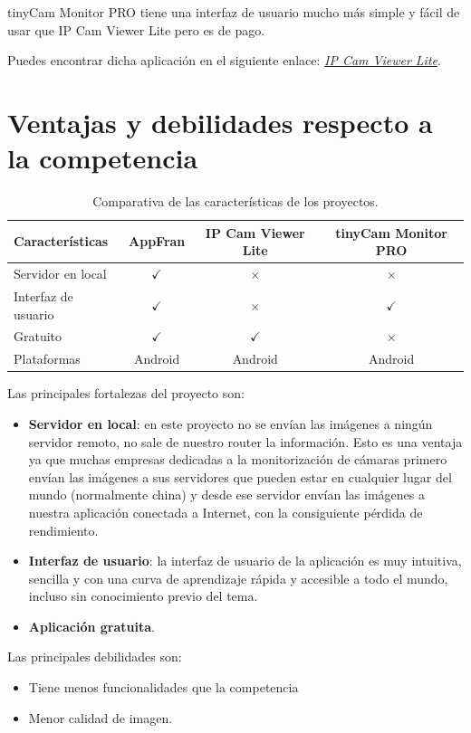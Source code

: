 tinyCam Monitor PRO tiene una interfaz de usuario mucho más simple y fácil de usar que IP Cam Viewer Lite pero es de pago.

Puedes encontrar dicha aplicación en el siguiente enlace: \href{https://play.google.com/store/apps/details?id=com.alexvas.dvr.pro&hl=es&gl=US}{\textit{IP Cam Viewer Lite}}.



\section{Ventajas y debilidades respecto a la competencia}


\begin{table}[h!]
\centering
\begin{tabular}{lccc}
\toprule
Características                 & AppFran     & IP Cam Viewer Lite & tinyCam Monitor PRO   \\
\midrule
Servidor en local               & \cellcolor{green!25} {$\checkmark$} & \cellcolor{red!25} {$\times$}  & \cellcolor{red!25} {$\times$}  \\
Interfaz de usuario             & \cellcolor{green!25} {$\checkmark$} & \cellcolor{red!25} {$\times$}  & \cellcolor{green!25} {$\checkmark$}  \\
Gratuito                        & \cellcolor{green!25} {$\checkmark$} & \cellcolor{green!25} {$\checkmark$}  & \cellcolor{red!25} {$\times$}  \\
Plataformas                     & Android    & Android     & Android     \\
\bottomrule
\end{tabular}
\caption{Comparativa de las características de los proyectos.}
\label{comparativa-proyectos}
\end{table}

Las principales fortalezas del proyecto son:

\begin{itemize}
\tightlist
\item
  \textbf{Servidor en local}: en este proyecto no se envían las imágenes a ningún servidor remoto, no sale de nuestro router la información. Esto es una ventaja ya que muchas empresas dedicadas a la monitorización de cámaras primero envían las imágenes a sus servidores que pueden estar en cualquier lugar del mundo (normalmente china) y desde ese servidor envían las imágenes a nuestra aplicación conectada a Internet, con la consiguiente pérdida de rendimiento.
\item
  \textbf{Interfaz de usuario}: la interfaz de usuario de la aplicación es muy intuitiva, sencilla y con una curva de aprendizaje rápida y accesible a todo el mundo, incluso sin conocimiento previo del tema.
\item
  \textbf{Aplicación gratuita}.
\end{itemize}

Las principales debilidades son:

\begin{itemize}
\tightlist
\item
  Tiene menos funcionalidades que la competencia
\item
  Menor calidad de imagen.
\end{itemize}






